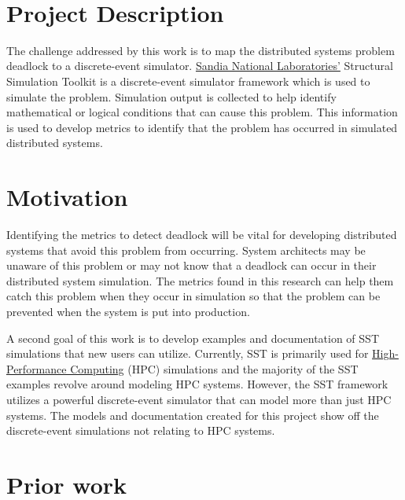 \documentclass{article}
\begin{document}
\ \\


\section{Project Description} %

The challenge addressed by this work is to map the distributed systems problem deadlock to a discrete-event simulator. \href{https://www.sandia.gov/}{Sandia National Laboratories'} Structural Simulation Toolkit is a discrete-event simulator framework which is used to simulate the problem. Simulation output is collected to help identify mathematical or logical conditions that can cause this problem. This information is used to develop metrics to identify that the problem has occurred in simulated distributed systems.

\section{Motivation} %
Identifying the metrics to detect deadlock will be vital for developing distributed systems that avoid this problem from occurring. System architects may be unaware of this problem or may not know that a deadlock can occur in their distributed system simulation. The metrics found in this research can help them catch this problem when they occur in simulation so that the problem can be prevented when the system is put into production.

A second goal of this work is to develop examples and documentation of SST simulations that new users can utilize. Currently, SST is primarily used for \href{https://en.wikipedia.org/wiki/High-performance_computing}{High-Performance Computing} (HPC) simulations and the majority of the SST examples revolve around modeling HPC systems. However, the SST framework utilizes a powerful discrete-event simulator that can model more than just HPC systems. The models and documentation created for this project show off the discrete-event simulations not relating to HPC systems.

\section{Prior work} %
\end{document}
